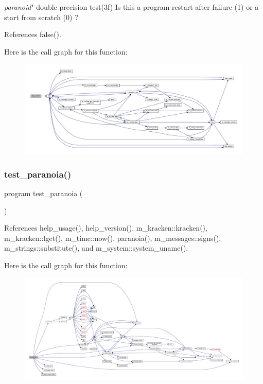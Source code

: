 {\itshape paranoid}" double precision test(3f) Is this a program restart after failure (1) or a start from scratch (0) ? 

References false().

Here is the call graph for this function\+:
\nopagebreak
\begin{figure}[H]
\begin{center}
\leavevmode
\includegraphics[width=350pt]{paranoid_8f90_a39c21619b08a3c22f19e2306efd7f766_cgraph}
\end{center}
\end{figure}
\mbox{\label{paranoid_8f90_a5ee1dc76ca482e8a4a44cbd213cce4c1}} 
\subsubsection{\texorpdfstring{test\+\_\+paranoia()}{test\_paranoia()}}
{\footnotesize\ttfamily program test\+\_\+paranoia (\begin{DoxyParamCaption}{ }\end{DoxyParamCaption})}



References help\+\_\+usage(), help\+\_\+version(), m\+\_\+kracken\+::kracken(), m\+\_\+kracken\+::lget(), m\+\_\+time\+::now(), paranoia(), m\+\_\+messages\+::signs(), m\+\_\+strings\+::substitute(), and m\+\_\+system\+::system\+\_\+uname().

Here is the call graph for this function\+:
\nopagebreak
\begin{figure}[H]
\begin{center}
\leavevmode
\includegraphics[width=350pt]{paranoid_8f90_a5ee1dc76ca482e8a4a44cbd213cce4c1_cgraph}
\end{center}
\end{figure}
